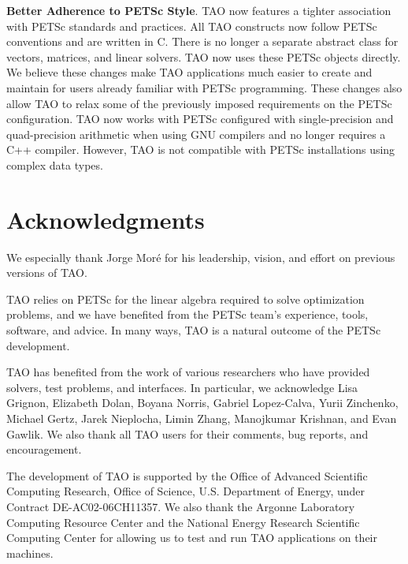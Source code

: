 \documentclass[]{book}
\begin{document}
\vspace{7mm}
\noindent \textbf{Better Adherence to PETSc Style}. TAO now features a tighter association with PETSc standards and practices.  All 
TAO constructs now follow PETSc conventions and are written in C.  There is 
no longer a separate abstract class for vectors, matrices, and linear 
solvers. TAO now uses these PETSc objects directly.  We believe these 
changes make TAO applications much easier to create and maintain for 
users already familiar with PETSc programming. These changes also allow 
TAO to relax some of the previously imposed requirements on the PETSc 
configuration.  TAO now works with PETSc configured with single-precision 
and quad-precision arithmetic when using GNU compilers and no longer 
requires a C++ compiler.  However, TAO is not compatible with PETSc 
installations using complex data types.


%
%

\section*{Acknowledgments}

We especially thank Jorge Mor\'e for his leadership, vision, and effort on 
previous versions of TAO.  

TAO relies on PETSc for the linear algebra required to solve optimization
problems, and we have benefited from the PETSc team's experience, tools, 
software, 
and advice. In many ways, TAO is a natural outcome of the PETSc 
development.  

TAO has benefited from the work of various researchers who have provided 
solvers, test problems, and interfaces.  In particular, we acknowledge Lisa 
Grignon, Elizabeth Dolan, Boyana Norris, Gabriel Lopez-Calva, Yurii Zinchenko, 
Michael Gertz, Jarek Nieplocha, Limin Zhang, Manojkumar Krishnan, and Evan 
Gawlik.  We also thank all TAO users for their comments, bug reports, and 
encouragement.

The development of TAO is supported by the Office of Advanced Scientific 
Computing Research, Office of Science, U.S. Department of Energy, under 
Contract DE-AC02-06CH11357.  We also thank the Argonne Laboratory Computing 
Resource Center and the National Energy Research Scientific Computing Center 
for allowing us to test and run TAO applications on their machines.
\end{document}
